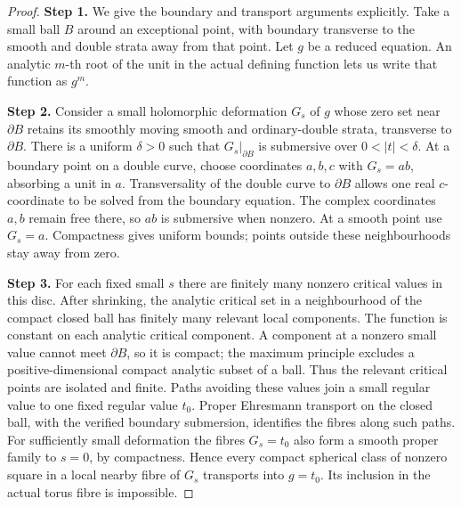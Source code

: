 \begin{proof}
\noindent\textbf{Step 1.} We give the boundary and transport arguments explicitly.
Take a small ball $B$ around an exceptional point, with
boundary transverse to the smooth and double strata away
from that point. Let $g$ be a reduced equation. An analytic
$m$-th root of the unit in the actual defining function lets
us write that function as $g^m$.

\noindent\textbf{Step 2.} Consider a small holomorphic deformation $G_s$ of $g$ whose
zero set near $\partial B$ retains its smoothly moving smooth
and ordinary-double strata, transverse to $\partial B$.
There is a uniform $\delta>0$ such that
$G_s|_{\partial B}$ is submersive over $0<|t|<\delta$.
At a boundary point on a double curve, choose coordinates
$a,b,c$ with $G_s=ab$, absorbing a unit in $a$.
Transversality of the double curve to $\partial B$ allows one
real $c$-coordinate to be solved from the boundary equation.
The complex coordinates $a,b$ remain free there, so $ab$ is
submersive when nonzero. At a smooth point use $G_s=a$.
Compactness gives uniform bounds; points outside these
neighbourhoods stay away from zero.

\noindent\textbf{Step 3.} For each fixed small $s$ there are finitely many nonzero
critical values in this disc. After shrinking, the analytic
critical set in a neighbourhood of the compact closed ball
has finitely many relevant local components. The function is constant on
each analytic critical component. A component at a nonzero
small value cannot meet $\partial B$, so it is compact;
the maximum principle excludes a positive-dimensional
compact analytic subset of a ball. Thus the relevant critical
points are isolated and finite. Paths avoiding these values
join a small regular value to one fixed regular value $t_0$.
Proper Ehresmann transport on the closed ball, with the
verified boundary submersion, identifies the fibres along
such paths. For sufficiently small deformation the fibres
$G_s=t_0$ also form a smooth proper family to $s=0$, by
compactness. Hence every compact spherical class of nonzero
square in a local nearby fibre of $G_s$ transports into
$g=t_0$. Its inclusion in the actual torus fibre is impossible.


\end{proof}
